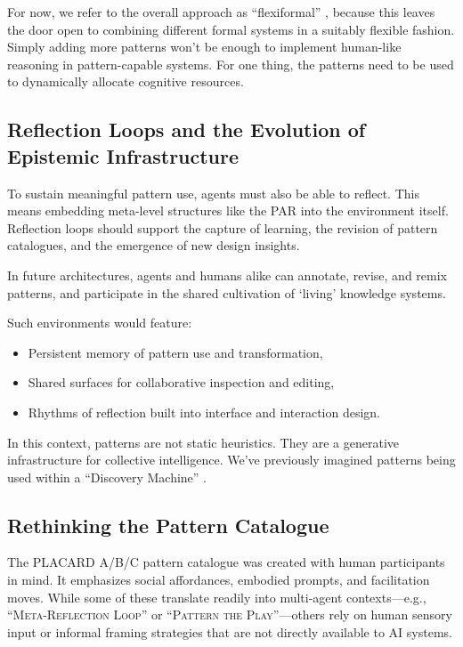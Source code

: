 \documentclass[acmlarge,timestamp]{acmart}
\providecommand{\tightlist}{%
  \setlength{\itemsep}{0pt}\setlength{\parskip}{0pt}}
\begin{document}
For now, we refer to the overall approach as ``flexiformal''
\cite{6481008}, because this leaves the door open to combining
different formal systems in a suitably flexible fashion. Simply adding
more patterns won't be enough to implement human-like reasoning in
pattern-capable systems.  For one thing, the patterns need to be used
to dynamically allocate cognitive resources.

\subsection{Reflection Loops and the Evolution of Epistemic Infrastructure}

To sustain meaningful pattern use, agents must also be able to
reflect.  This means embedding meta-level structures like the PAR into
the environment itself.  Reflection loops should support the capture
of learning, the revision of pattern catalogues, and the emergence of
new design insights.

In future architectures, agents and humans alike can annotate, revise,
and remix patterns, and participate in the shared cultivation of
‘living’ knowledge systems.

{Such environments would feature:}

\begin{itemize}
\tightlist
\item
  {Persistent memory of pattern use and transformation,}
\item
  {Shared surfaces for collaborative inspection and editing,}
\item
  {Rhythms of reflection built into interface and interaction design.}
\end{itemize}

In this context, patterns are not static heuristics. They are a
generative infrastructure for collective intelligence.  We’ve
previously imagined patterns being used within a “Discovery Machine”
\cite{Tedeschi2024}.

\subsection{Rethinking the Pattern Catalogue}

The PLACARD A/B/C pattern catalogue was created with human
participants in mind. It emphasizes social affordances, embodied
prompts, and facilitation moves. While some of these translate readily
into multi-agent contexts---e.g., “{\scshape {Meta-Reflection Loop}}”
or “{\scshape {Pattern the Play}}”---others rely on human sensory
input or informal framing strategies that are not directly available
to AI systems.
\end{document}
